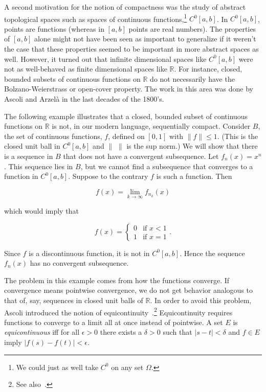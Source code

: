 \documentclass[12pt]{article}
\begin{document}
A second motivation for the notion of compactness was the study of abstract topological spaces such as spaces of continuous functions,\footnote{We could just as well take $C^0$ on any set $\Omega$.} $C^0[a,b]$. In $C^0[a,b]$, points are functions (whereas in $[a,b]$ points are real numbers). The properties of $[a,b]$ alone might not have been seen as important to generalize if it weren't the case that these properties seemed to be important in more abstract spaces as well. However, it turned out that infinite dimensional spaces like $C^0[a,b]$ were not as well-behaved as finite dimensional spaces like $\mathbb{R}$. For instance, closed, bounded
subsets of continuous functions on $\mathbb{R}$ do not necessarily have the Bolzano-Weierstrass or open-cover property. The work in this area was done by Ascoli and Arzel\`{a} in the last decades of the 1800's.

The following example illustrates that a closed, bounded subset
of continuous functions on $\mathbb{R}$ is not, in our modern language, sequentially compact. 
Consider $B$, the set of continuous functions, $f$, defined on $[0,1]$ with $\|f\| \leq1$.  
(This is the closed unit ball in $C^0[a,b]$ and $\|$ $\|$ is the sup
norm.) We will show that there is a sequence in $B$ that does not have a convergent
subsequence. Let $f_n(x)=x^n$. This sequence lies in $B$, but we cannot find a subsequence
that converges to a function in $C^0[a,b]$. Suppose to the contrary $f$ is such a function. Then

\[f(x) =\lim_{k \rightarrow \infty} f_{n_k}(x) \] 

which would imply that 

\[f(x)=\left\{ \begin{array}{ll}
               0  & \mbox{if $x<1$}\\
		               1  & \mbox{if $x=1$}
               \end{array}.
       \right. \]

Since $f$ is a discontinuous function, it is not in $C^0[a,b]$. Hence the sequence
$f_n(x)$ has no convergent subsequence.

The problem in this example comes from how the functions converge. If convergence
means pointwise convergence, we do not get behavior analogous to that of, say,
sequences in closed unit balls of $\mathbb{R}$. In order to avoid this problem, Ascoli
introduced the notion of equicontinuity~\cite[p. 566]{asc1}.\footnote{See also~\cite[p. 27]{bour}.} Equicontinuity
requires functions to converge to a limit all at once instead of pointwise. A set $E$
is {\em equicontinuous} iff for all $\epsilon > 0$ there exists a $\delta>0$  such
that $|s-t| < \delta$ and $f \in E$ imply $|f(s)-f(t)|< \epsilon$.
\end{document}
